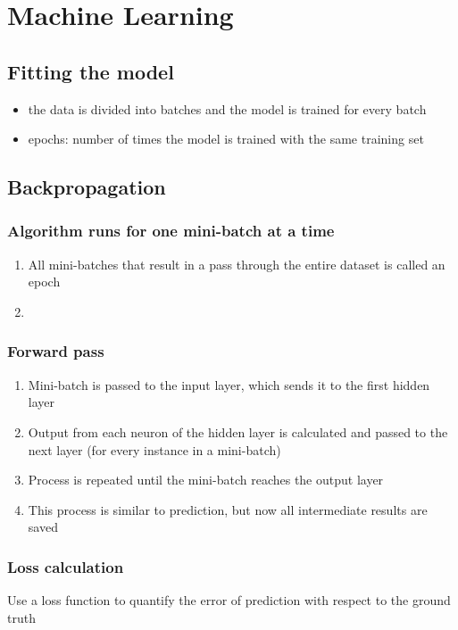 \documentclass[11pt]{article}
\begin{document}
\section{Machine Learning}
\label{sec:org1ee5538}
\subsection{Fitting the model}
\label{sec:org7dc7bac}
\begin{itemize}
\item the data is divided into batches and the model is trained for every batch
\item epochs: number of times the model is trained with the same training set
\end{itemize}
\subsection{Backpropagation}
\label{sec:org994c48d}
\subsubsection{Algorithm runs for one mini-batch at a time}
\label{sec:org4d4b58c}
\begin{enumerate}
\item All mini-batches that result in a pass through the entire dataset is called an epoch
\item 
\end{enumerate}
\subsubsection{Forward pass}
\label{sec:orgb0a4212}
\begin{enumerate}
\item Mini-batch is passed to the input layer, which sends it to the first hidden layer
\item Output from each neuron of the hidden layer is calculated and passed to the next layer (for every instance in a mini-batch)
\item Process is repeated until the mini-batch reaches the output layer
\item This process is similar to prediction, but now all intermediate results are saved
\end{enumerate}
\subsubsection{Loss calculation}
\label{sec:org6471420}
Use a loss function to quantify the error of prediction with respect to the ground truth
\end{document}
